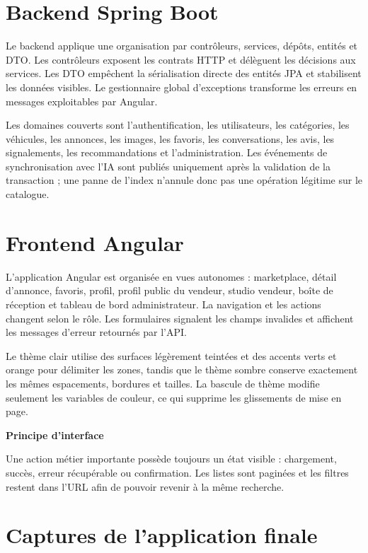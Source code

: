 \section{Backend Spring Boot}

Le backend applique une organisation par contrôleurs, services, dépôts, entités et DTO. Les contrôleurs exposent les contrats HTTP et délèguent les décisions aux services. Les DTO empêchent la sérialisation directe des entités JPA et stabilisent les données visibles. Le gestionnaire global d'exceptions transforme les erreurs en messages exploitables par Angular.


Les domaines couverts sont l'authentification, les utilisateurs, les catégories, les véhicules, les annonces, les images, les favoris, les conversations, les avis, les signalements, les recommandations et l'administration. Les événements de synchronisation avec l'IA sont publiés uniquement après la validation de la transaction ; une panne de l'index n'annule donc pas une opération légitime sur le catalogue.


\section{Frontend Angular}

L'application Angular est organisée en vues autonomes : marketplace, détail d'annonce, favoris, profil, profil public du vendeur, studio vendeur, boîte de réception et tableau de bord administrateur. La navigation et les actions changent selon le rôle. Les formulaires signalent les champs invalides et affichent les messages d'erreur retournés par l'API.


Le thème clair utilise des surfaces légèrement teintées et des accents verts et orange pour délimiter les zones, tandis que le thème sombre conserve exactement les mêmes espacements, bordures et tailles. La bascule de thème modifie seulement les variables de couleur, ce qui supprime les glissements de mise en page.


\textbf{Principe d'interface}

Une action métier importante possède toujours un état visible : chargement, succès, erreur récupérable ou confirmation. Les listes sont paginées et les filtres restent dans l'URL afin de pouvoir revenir à la même recherche.


\section{Captures de l'application finale}

